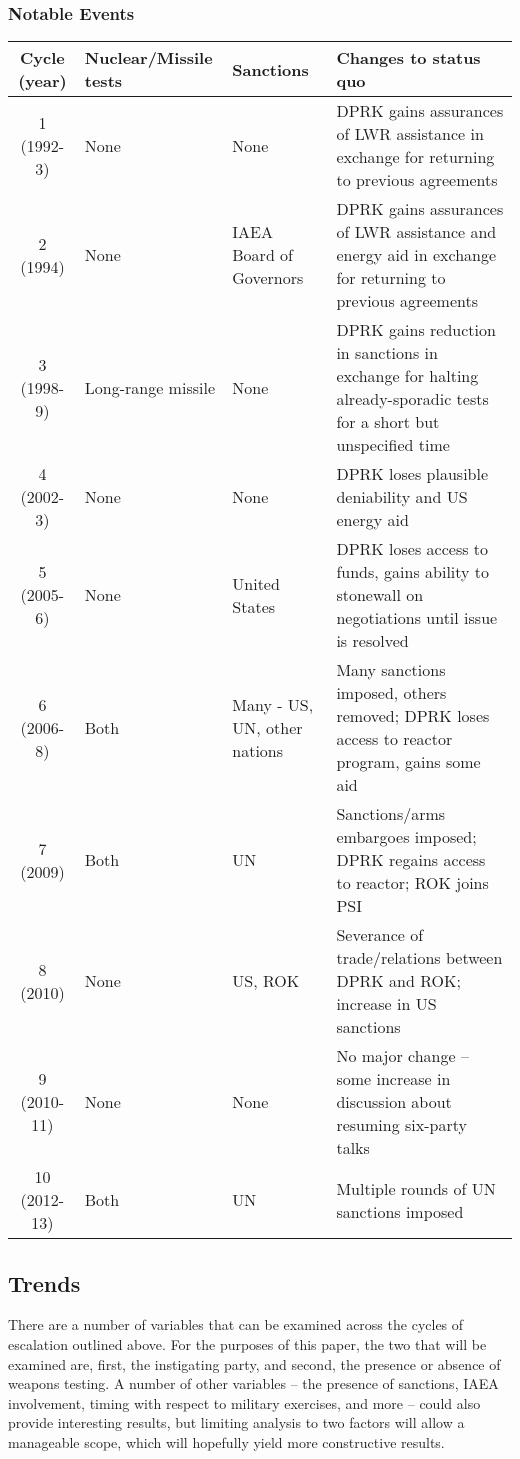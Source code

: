 \documentclass{article}
\begin{document}
\subsubsection{Notable Events} 
\begin{tabular}{|c|p{2.4cm}|p{1.6cm}|p{8cm}|}
	\hline
	Cycle (year) & Nuclear/Missile tests & Sanctions & Changes to status quo \\ 
	\hline
	1 (1992-3) & None & None & DPRK gains assurances of LWR assistance in exchange for returning to previous agreements \\ 
	\hline
	2 (1994) & None & IAEA Board of Governors & DPRK gains assurances of LWR assistance and energy aid in exchange for returning to previous agreements \\ 
	\hline
	3 (1998-9) & Long-range missile & None & DPRK gains reduction in sanctions in exchange for halting already-sporadic tests for a short but unspecified time \\ 
	\hline
	4 (2002-3) & None & None & DPRK loses plausible deniability and US energy aid \\ 
	\hline
	5 (2005-6) & None & United States & DPRK loses access to funds, gains ability to stonewall on negotiations until issue is resolved \\ 
	\hline
	6 (2006-8) & Both & Many - US, UN, other nations & Many sanctions imposed, others removed; DPRK loses access to reactor program, gains some aid \\ 
	\hline
	7 (2009) & Both & UN & Sanctions/arms embargoes imposed; DPRK regains access to reactor; ROK joins PSI \\ 
	\hline
	8 (2010) & None & US, ROK & Severance of trade/relations between DPRK and ROK; increase in US sanctions \\ 
	\hline
	9 (2010-11) & None & None & No major change – some increase in discussion about resuming six-party talks \\ 
	\hline
	10 (2012-13) & Both & UN & Multiple rounds of UN sanctions imposed \\
	\hline
\end{tabular} 

\subsection{Trends}

There are a number of variables that can be examined across the cycles of escalation outlined above. For the purposes of this paper, the two that will be examined are, first, the instigating party, and second, the presence or absence of weapons testing. A number of other variables – the presence of sanctions, IAEA involvement, timing with respect to military exercises, and more – could also provide interesting results, but limiting analysis to two factors will allow a manageable scope, which will hopefully yield more constructive results.
\end{document}

